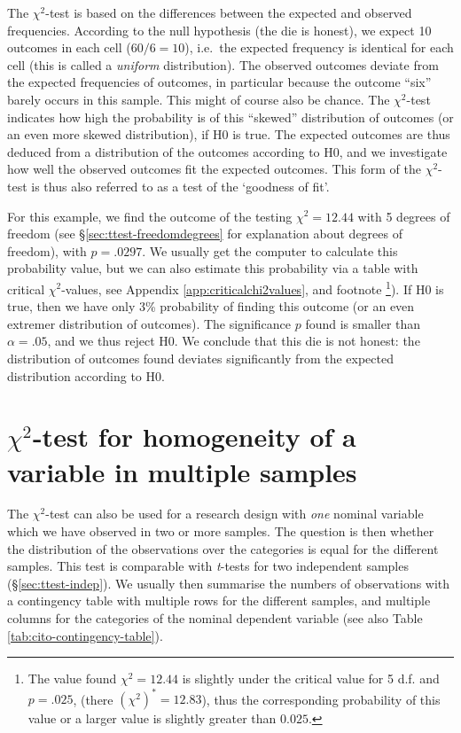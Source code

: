 \documentclass[
]{book}
\begin{document}
The \(\chi^2\)-test is based on the differences between the expected
and observed frequencies. According to the null hypothesis (the die is honest),
we expect 10 outcomes in each cell (\(60/6=10\)), i.e.~the
expected frequency is identical for each cell (this is called
a \emph{uniform} distribution).
The observed outcomes deviate from the expected frequencies of outcomes,
in particular because the outcome ``six'' barely occurs in this sample. This
might of course also be chance. The \(\chi^2\)-test indicates how high the probability
is of this ``skewed'' distribution of outcomes (or an even more skewed distribution),
if H0 is true.
The expected outcomes are thus deduced from a distribution of the outcomes
according to H0, and we investigate how well the observed outcomes
fit the expected outcomes. This form of the \(\chi^2\)-test is thus also
referred to as a test of the `goodness of fit'.

For this example, we find the outcome of the testing \(\chi^2=12.44\)
with 5 degrees of freedom (see
§\ref{sec:ttest-freedomdegrees} for explanation about
degrees of freedom), with \(p=.0297\). We usually get the computer to
calculate this probability value, but we can also estimate this probability
via a table with critical
\(\chi^2\)-values, see Appendix \ref{app:criticalchi2values}, and footnote
\footnote{The value found \(\chi^2=12.44\) is slightly under the critical value for
  5 d.f. and \(p=.025\), (there \((\chi^2)^*=12.83\)), thus the corresponding probability
  of this value or a larger value is slightly greater than \(0.025\).}).
If H0 is true, then we have only 3\% probability
of finding this outcome (or an even extremer distribution of outcomes).
The significance \(p\) found is smaller than \(\alpha=.05\), and we thus
reject H0. We conclude that this die is not honest: the distribution
of outcomes found deviates significantly from the expected
distribution according to H0.

\hypertarget{chi2-test-for-homogeneity-of-a-variable-in-multiple-samples}{%
\section{\texorpdfstring{\(\chi^2\)-test for homogeneity of a variable in multiple samples}{\textbackslash chi\^{}2-test for homogeneity of a variable in multiple samples}}\label{chi2-test-for-homogeneity-of-a-variable-in-multiple-samples}}

The \(\chi^2\)-test can also be used for a research design with \emph{one} nominal
variable which we have observed in two or more samples. The
question is then whether the distribution of the observations over the
categories is equal for the different samples. This test is comparable with
\emph{t}-tests for two independent samples
(§\ref{sec:ttest-indep}). We usually then summarise the numbers of observations
with a contingency table with multiple rows for the different samples,
and multiple columns for the categories of the
nominal dependent variable (see also
Table \ref{tab:cito-contingency-table}).
\end{document}
